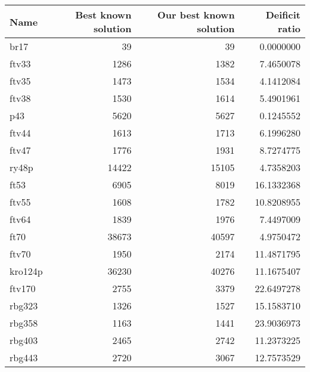\begin{table}
\centering
\begin{tabular}{l|r|r|r}
\hline
Name & Best known solution & Our best known solution & Deificit ratio\\
\hline
br17 & 39 & 39 & 0.0000000\\
\hline
ftv33 & 1286 & 1382 & 7.4650078\\
\hline
ftv35 & 1473 & 1534 & 4.1412084\\
\hline
ftv38 & 1530 & 1614 & 5.4901961\\
\hline
p43 & 5620 & 5627 & 0.1245552\\
\hline
ftv44 & 1613 & 1713 & 6.1996280\\
\hline
ftv47 & 1776 & 1931 & 8.7274775\\
\hline
ry48p & 14422 & 15105 & 4.7358203\\
\hline
ft53 & 6905 & 8019 & 16.1332368\\
\hline
ftv55 & 1608 & 1782 & 10.8208955\\
\hline
ftv64 & 1839 & 1976 & 7.4497009\\
\hline
ft70 & 38673 & 40597 & 4.9750472\\
\hline
ftv70 & 1950 & 2174 & 11.4871795\\
\hline
kro124p & 36230 & 40276 & 11.1675407\\
\hline
ftv170 & 2755 & 3379 & 22.6497278\\
\hline
rbg323 & 1326 & 1527 & 15.1583710\\
\hline
rbg358 & 1163 & 1441 & 23.9036973\\
\hline
rbg403 & 2465 & 2742 & 11.2373225\\
\hline
rbg443 & 2720 & 3067 & 12.7573529\\
\hline
\end{tabular}
\end{table}
